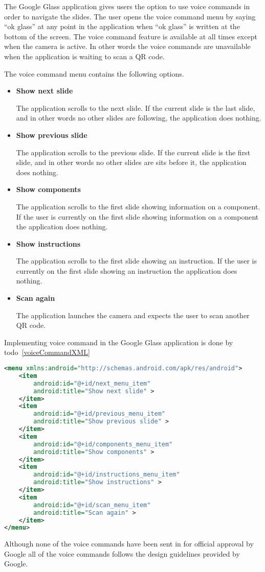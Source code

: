 The Google Glass application gives users the option to use voice commands in order to navigate the slides. The user opens the voice command menu by saying ``ok glass'' at any point in the application when ``ok glass'' is written at the bottom of the screen. The voice command feature is available at all times except when the camera is active. In other words the voice commands are unavailable when the application is waiting to scan a QR code.

The voice command menu contains the following options.

\begin{itemize}
	\item \textbf{Show next slide}
	
	The application scrolls to the next slide. If the current slide is the last slide, and in other words no other slides are following, the application does nothing.
	\item \textbf{Show previous slide}
	
	The application scrolls to the previous slide. If the current slide is the first slide, and in other words no other slides are sits before it, the application does nothing.
	\item \textbf{Show components}
	
	The application scrolls to the first slide showing information on a component. If the user is currently on the first slide showing information on a component the application does nothing. 
	\item \textbf{Show instructions}
	
	The application scrolls to the first slide showing an instruction. If the user is currently on the first slide showing an instruction the application does nothing.
	\item \textbf{Scan again}
	
	The application launches the camera and expects the user to scan another QR code.
\end{itemize}

Implementing voice command in the Google Glass application is done by todo~\ref{voiceCommandXML}

\begin{lstlisting}[language=XML, caption={The voice command menu XML file}, label=voiceCommandXML]
<menu xmlns:android="http://schemas.android.com/apk/res/android">
	<item
		android:id="@+id/next_menu_item"
		android:title="Show next slide" >
	</item>
	<item
		android:id="@+id/previous_menu_item"
		android:title="Show previous slide" >
	</item>
	<item
		android:id="@+id/components_menu_item"
		android:title="Show components" >
	</item>
	<item
		android:id="@+id/instructions_menu_item"
		android:title="Show instructions" >
	</item>
	<item
		android:id="@+id/scan_menu_item"
		android:title="Scan again" >
	</item>
</menu>
\end{lstlisting}

Although none of the voice commands have been sent in for official approval by Google all of the voice commands follows the design guidelines provided by Google. 

